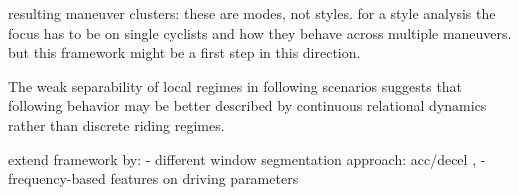 resulting maneuver clusters: these are modes, not styles. for a style analysis the focus has to be on single cyclists and how they behave across multiple maneuvers. but this framework might be a first step in this direction.

The weak separability of local regimes in following scenarios suggests that following behavior may be better described by continuous relational dynamics rather than discrete riding regimes.


extend framework by:
 - different window segmentation approach: acc/decel \citeauthor{yarlagadda_exploring_2022}, 
 - frequency-based features on driving parameters \cite{chen_feature_2023}
\fi